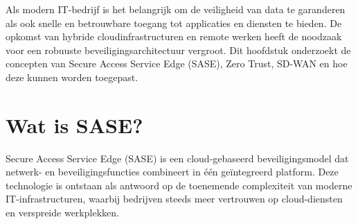 




Als modern IT-bedrijf is het belangrijk om de veiligheid van data te garanderen als ook snelle en betrouwbare toegang tot applicaties en diensten te bieden. De opkomst van hybride cloudinfrastructuren en remote werken heeft de noodzaak voor een robuuste beveiligingsarchitectuur vergroot. Dit hoofdstuk onderzoekt de concepten van Secure Access Service Edge (SASE), Zero Trust, SD-WAN en hoe deze kunnen worden toegepast.

\section{Wat is SASE?}
Secure Access Service Edge (SASE) is een cloud-gebaseerd beveiligingsmodel dat netwerk- en beveiligingsfuncties combineert in één geïntegreerd platform. Deze technologie is ontstaan als antwoord op de toenemende complexiteit van moderne IT-infrastructuren, waarbij bedrijven steeds meer vertrouwen op cloud-diensten en verspreide werkplekken.

